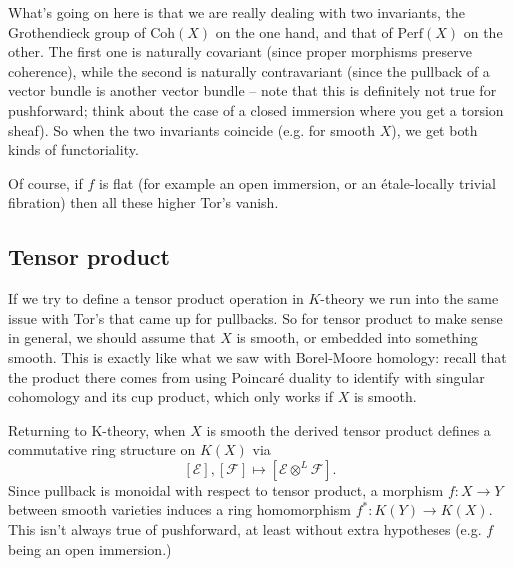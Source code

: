\documentclass[11pt]{amsart}
\theoremstyle{definition}
\newcommand{\Ec}{\mathcal{E}}
\newcommand{\Fc}{\mathcal{F}}
\newcommand{\Perf}{\mathrm{Perf}}
\newcommand{\Coh}{\mathrm{Coh}}
\numberwithin{equation}{subsection}
\numberwithin{figure}{subsection}
\begin{document}
What's going on here is that we are really dealing with two invariants, the Grothendieck group of $\Coh(X)$ on the one hand, and that of $\Perf(X)$ on the other. The first one is naturally covariant (since proper morphisms preserve coherence), while the second is naturally contravariant (since the pullback of a vector bundle is another vector bundle -- note that this is definitely not true for pushforward; think about the case of a closed immersion where you get a torsion sheaf). So when the two invariants coincide (e.g. for smooth $X$), we get both kinds of functoriality.




 Of course, if $f$ is flat (for example an open immersion, or an \'etale-locally trivial fibration) then all these higher Tor's vanish.



 
\subsection{Tensor product} 
 
If we try to define a tensor product operation in $K$-theory we run into the same issue with Tor's that came up for pullbacks. So for tensor product to make sense in general, we should assume that $X$ is smooth, or embedded into something smooth. This is exactly like what we saw with Borel-Moore homology: recall that the product there comes from using Poincar\'e duality to identify with singular cohomology and its cup product, which only works if $X$ is smooth.

Returning to K-theory, when $X$ is smooth the derived tensor product defines a commutative ring structure on $K(X)$ via
$$
[\Ec],[\Fc] \mapsto [\Ec\otimes^L\Fc].
$$ Since pullback is monoidal with respect to tensor product, a morphism $f:X\rightarrow Y$ between smooth varieties induces a ring homomorphism $f^*:K(Y)\rightarrow K(X)$. This isn't always true of pushforward, at least without extra hypotheses (e.g. $f$ being an open immersion.) 
\end{document}
